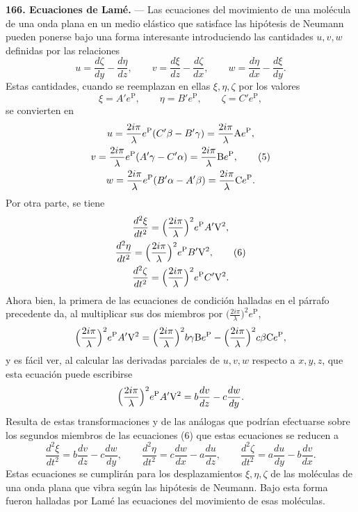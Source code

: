 \noindent\textbf{166. Ecuaciones de Lamé.} — Las ecuaciones del
movimiento de una molécula de una onda plana en un medio elástico que
satisface las hipótesis de Neumann pueden ponerse bajo una forma
interesante introduciendo las cantidades $u,v,w$ definidas por las
relaciones
\[
u=\frac{d\zeta}{dy}-\frac{d\eta}{dz},\qquad
v=\frac{d\xi}{dz}-\frac{d\zeta}{dx},\qquad
w=\frac{d\eta}{dx}-\frac{d\xi}{dy}.
\]
Estas cantidades, cuando se reemplazan en ellas $\xi,\eta,\zeta$ por los
valores
\[
\xi=A'e^{\mathrm P},\qquad \eta=B'e^{\mathrm P},\qquad \zeta=C'e^{\mathrm P},
\]
se convierten en
\begin{gather}
u=\frac{2i\pi}{\lambda}e^{\mathrm P}(C'\beta-B'\gamma)=\frac{2i\pi}{\lambda}\mathrm Ae^{\mathrm P},\notag\\
v=\frac{2i\pi}{\lambda}e^{\mathrm P}(A'\gamma-C'\alpha)=\frac{2i\pi}{\lambda}\mathrm Be^{\mathrm P},
\tag{5}\\
w=\frac{2i\pi}{\lambda}e^{\mathrm P}(B'\alpha-A'\beta)=\frac{2i\pi}{\lambda}\mathrm Ce^{\mathrm P}.\notag
\end{gather}
Por otra parte, se tiene
\begin{gather}
\frac{d^2\xi}{dt^2}=\Bigl(\frac{2i\pi}{\lambda}\Bigr)^2e^{\mathrm P}A'\mathrm V^2,\notag\\
\frac{d^2\eta}{dt^2}=\Bigl(\frac{2i\pi}{\lambda}\Bigr)^2e^{\mathrm P}B'\mathrm V^2,
\tag{6}\\
\frac{d^2\zeta}{dt^2}=\Bigl(\frac{2i\pi}{\lambda}\Bigr)^2e^{\mathrm P}C'\mathrm V^2.\notag
\end{gather}
Ahora bien, la primera de las ecuaciones de condición halladas en el
párrafo precedente da, al multiplicar sus dos miembros por
$\bigl(\tfrac{2i\pi}{\lambda}\bigr)^2e^{\mathrm P}$,
\[
\Bigl(\frac{2i\pi}{\lambda}\Bigr)^2e^{\mathrm P}A'\mathrm V^2
=\Bigl(\frac{2i\pi}{\lambda}\Bigr)^2b\gamma \mathrm Be^{\mathrm P}
-\Bigl(\frac{2i\pi}{\lambda}\Bigr)^2c\beta \mathrm Ce^{\mathrm P},
\]
y es fácil ver, al calcular las derivadas parciales de $u,v,w$ respecto a
$x,y,z$, que esta ecuación puede escribirse
\[
\Bigl(\frac{2i\pi}{\lambda}\Bigr)^2e^{\mathrm P}A'\mathrm V^2=b\frac{dv}{dz}-c\frac{dw}{dy}.
\]
Resulta de estas transformaciones y de las análogas que podrían
efectuarse sobre los segundos miembros de las ecuaciones (6) que estas
ecuaciones se reducen a
\begin{equation}
\frac{d^2\xi}{dt^2}=b\frac{dv}{dz}-c\frac{dw}{dy},\qquad
\frac{d^2\eta}{dt^2}=c\frac{dw}{dx}-a\frac{du}{dz},\qquad
\frac{d^2\zeta}{dt^2}=a\frac{du}{dy}-b\frac{dv}{dx}.
\tag{7}
\end{equation}
Estas ecuaciones se cumplirán para los desplazamientos $\xi,\eta,\zeta$
de las moléculas de una onda plana que vibra según las hipótesis de
Neumann. Bajo esta forma fueron halladas por Lamé las ecuaciones del
movimiento de esas moléculas.

